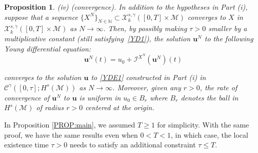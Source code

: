 \documentclass[letterpaper, 11pt,  reqno]{amsart}
\newtheorem{proposition}[theorem]{Proposition}
\newcommand{\1}{\hspace{0.5mm}\text{I}\hspace{0.5mm}}
\newcommand{\I}{\mathcal{I}}
\newcommand{\noi}{\noindent}
\newcommand{\CC}{\mathcal{C}}
\newcommand{\g}{\gamma}
\newcommand{\M}{\mathcal{M}}
\newcommand{\N}{\mathbb{N}}
\newcommand{\cX}{\mathcal{X}}
\newcommand{\uu}{\mathbf{u}}
\numberwithin{equation}{section}
\numberwithin{theorem}{section}
\begin{document}
\begin{proposition}
\smallskip

\noi
\textup{(iv) (convergence).}
In addition to the hypotheses in Part (i), 
suppose  that a sequence $\{X^N\}_{N \in \N}\subset 
 \cX^{s, \g}_k([0, T]\times \M)$
 converges to $X$ in 
 $ \cX^{s, \g}_k([0, T]\times \M)$ as $N \to \infty$.
Then, 
by possibly making $\tau > 0$ smaller by a multiplicative constant 
\textup{(}still satisfying~\eqref{YD1}\textup{)},  the solution 
$\uu^N$  %
to the following Young differential equation\textup{:}
\begin{equation}
\label{YDE2}
\uu^N(t) = u_0 + \I^{X^N}(\uu^N)(t)
\end{equation}

\noi
converges to the solution $\uu$ to \eqref{YDE1}
constructed in Part (i)  
 in $\CC^\g([0, \tau]; H^s(\M))$
as $N \to \infty$.
Moreover, 
given any $r > 0$, 
the rate of convergence of $\uu^N$ to $\uu$ is
uniform in $u_0 \in B_r$ 
where
$B_r$ denotes the ball 
in $H^s(\M)$
of radius $r > 0$ centered at the origin.



\end{proposition}


In Proposition \ref{PROP:main}, 
we assumed $T \ge 1$
for simplicity.
With the same proof, 
we have the same results even when $0 < T < 1$, 
in which case, 
the local existence time $\tau > 0$ 
needs to satisfy an additional constraint $\tau \le T$. 
\end{document}
